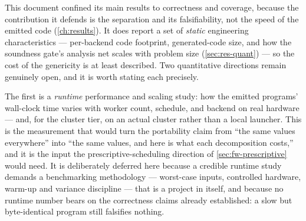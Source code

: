 This document confined its main results to correctness and coverage, because the
contribution it defends is the separation and its falsifiability, not the speed of
the emitted code (\cref{ch:results}). It does report a set of \emph{static}
engineering characteristics --- per-backend code footprint, generated-code size, and
how the soundness gate's analysis net scales with problem size
(\cref{sec:res-quant}) --- so the cost of the genericity is at least described. Two
quantitative directions remain genuinely open, and it is worth stating each
precisely.

The first is a \emph{runtime} performance and scaling study: how the emitted
programs' wall-clock time varies with worker count, schedule, and backend on real
hardware --- and, for the cluster tier, on an actual cluster rather than a local
launcher. This is the measurement that would turn the portability claim from ``the
same values everywhere'' into ``the same values, and here is what each decomposition
costs,'' and it is the input the prescriptive-scheduling direction of
\cref{sec:fw-prescriptive} would need. It is deliberately deferred here because a
credible runtime study demands a benchmarking methodology --- worst-case inputs,
controlled hardware, warm-up and variance discipline --- that is a project in itself,
and because no runtime number bears on the correctness claims already established: a
slow but byte-identical program still falsifies nothing.

